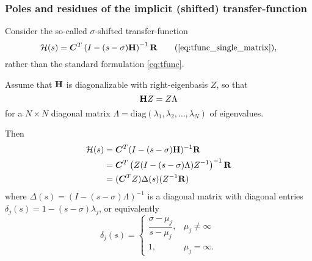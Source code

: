\begin{comment}
Then we can express the the pole-residue form of transfer-function \eqref{eq:tfunc} as 
\begin{equation}
          \tf(s)  =  \sum_{\mu_j=\infty} \hat{c}_j \hat{b}_j^T +
			   \sum_{\mu_j\neq\infty} \frac{\hat{c}_j \hat{b}_j^T}{s-\mu_j}\label{eq:comp_pole_sum}.
\end{equation}
Note that $\hat{c}_j$ and $\hat{b}_j$ are scalars if this is a SISO model. Generally, $\hat{c}_j \hat{b}_j^T\in\C^{\nout \times \nin}$.  The transpose $\hat{b}_j^T$ is in fact a transpose and not a conjugate-transpose, even if $\hat{b}_j$ is complex-valued.  
 

\smallskip
 Our necessary assumption  $\c{W} \E Z = I$ is not the default scaling for eigensolvers in practice.  In that case, we must consider the scaling factor
\[
\xi_j = 1 / w_j^H \E z_j
\]
for $j=1,2,\ldots,q$ and \eqref{eq:comp_pole_sum} generalizes to 
\begin{equation}
          \tf(s)  =  \sum_{\mu_j=\infty} \xi_j\hat{c}_j \hat{b}_j^T +
			   \sum_{\mu_j\neq\infty} \xi_j\frac{\hat{c}_j \hat{b}_j^T}{s-\mu_j}\label{eq:comp_pole_sum_gen}.
\end{equation}
\end{comment}



\subsubsection{Poles and residues of the implicit (shifted) transfer-function}\label{sec:polewts_shifted}
Consider  the so-called $\sigma$-shifted transfer-function 
\[
\tf(s) = \CC^T \left(I - (s-\sigma)\H \right)^{-1} \RR \tag{\ref{eq:tfunc_single_matrix}},
\] 
rather than the standard formulation \eqref{eq:tfunc}.  

 Assume that $\textbf{\textup{H}}$ is diagonalizable with right-eigenbasis $Z$, so that    
\[
\textbf{\textup{H}} Z =  Z \Lambda 
\] 
for a $N\times N$ diagonal matrix $\Lambda= \text{diag}(\lambda_1, \lambda_2,\ldots,\lambda_N)$ of eigenvalues.

Then
\begin{align}
\mathcal{H}(s) &= \bm{C}^T (I - (s-\sigma)\textbf{\textup{H}} )^{-1} \textbf{\textup{R}}\nonumber\\
&= \bm{C}^T \left( Z (I - (s-\sigma)\Lambda )Z^{-1} \right)^{-1} \textbf{\textup{R}} \nonumber\\
&= (\bm{C}^T Z) \Delta(s) (Z^{-1}\textbf{\textup{R}})
\end{align}
where $\Delta(s)=\left( I - (s-\sigma)\Lambda \right)^{-1}$ is a diagonal matrix with diagonal entries $\delta_{j}(s) =1-(s-\sigma)\lambda_j$, or equivalently
\begin{equation}
\delta_{j}(s) =
\begin{cases}
\dfrac{\sigma-\mu_j}{s-\mu_j},   & \mu_j \neq \infty\\
1, & \mu_j = \infty. 
\end{cases}
\label{eq:delta_def}
\end{equation}

